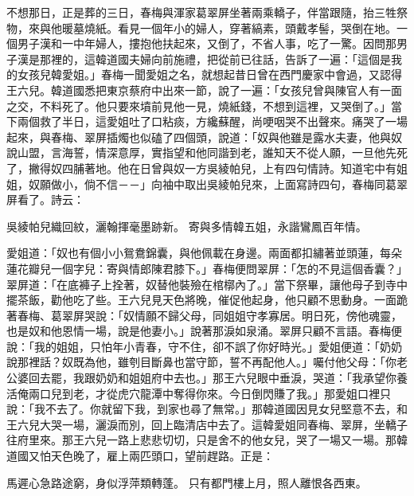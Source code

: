 不想那日，正是葬的三日，春梅與渾家葛翠屏坐著兩乘轎子，伴當跟隨，抬三牲祭物，來與他暖墓燒紙。看見一個年小的婦人，穿著縞素，頭戴孝髻，哭倒在地。一個男子漢和一中年婦人，摟抱他扶起來，又倒了，不省人事，吃了一驚。因問那男子漢是那裡的，這韓道國夫婦向前施禮，把從前已往話，告訴了一遍：「這個是我的女孩兒韓愛姐。」春梅一聞愛姐之名，就想起昔日曾在西門慶家中會過，又認得王六兒。韓道國悉把東京蔡府中出來一節，說了一遍：「女孩兒曾與陳官人有一面之交，不料死了。他只要來墳前見他一見，燒紙錢，不想到這裡，又哭倒了。」當下兩個救了半日，這愛姐吐了口粘痰，方纔蘇醒，尚哽咽哭不出聲來。痛哭了一場起來，與春梅、翠屏插燭也似磕了四個頭，說道：「奴與他雖是露水夫妻，他與奴說山盟，言海誓，情深意厚，實指望和他同諧到老，誰知天不從人願，一旦他先死了，撇得奴四脯著地。他在日曾與奴一方吳綾帕兒，上有四句情詩。知道宅中有姐姐，奴願做小，倘不信－－」向袖中取出吳綾帕兒來，上面寫詩四句，春梅同葛翠屏看了。詩云：

吳綾帕兒織回紋，灑翰揮毫墨跡新。
寄與多情韓五姐，永諧鸞鳳百年情。

愛姐道：「奴也有個小小鴛鴦錦囊，與他佩載在身邊。兩面都扣繡著並頭蓮，每朵蓮花瓣兒一個字兒：寄與情郎陳君膝下。」春梅便問翠屏：「怎的不見這個香囊？」翠屏道：「在底褲子上拴著，奴替他裝殮在棺槨內了。」當下祭畢，讓他母子到寺中擺茶飯，勸他吃了些。王六兒見天色將晚，催促他起身，他只顧不思動身。一面跪著春梅、葛翠屏哭說：「奴情願不歸父母，同姐姐守孝寡居。明日死，傍他魂靈，也是奴和他恩情一場，說是他妻小。」說著那淚如泉涌。翠屏只顧不言語。春梅便說：「我的姐姐，只怕年小青春，守不住，卻不誤了你好時光。」愛姐便道：「奶奶說那裡話？奴既為他，雖刳目斷鼻也當守節，誓不再配他人。」囑付他父母：「你老公婆回去罷，我跟奶奶和姐姐府中去也。」那王六兒眼中垂淚，哭道：「我承望你養活俺兩口兒到老，才從虎穴龍潭中奪得你來。今日倒閃賺了我。」那愛姐口裡只說：「我不去了。你就留下我，到家也尋了無常。」那韓道國因見女兒堅意不去，和王六兒大哭一場，灑淚而別，回上臨清店中去了。這韓愛姐同春梅、翠屏，坐轎子往府里來。那王六兒一路上悲悲切切，只是舍不的他女兒，哭了一場又一場。那韓道國又怕天色晚了，雇上兩匹頭口，望前趕路。正是：

馬遲心急路途窮，身似浮萍類轉蓬。
只有都門樓上月，照人離恨各西東。



